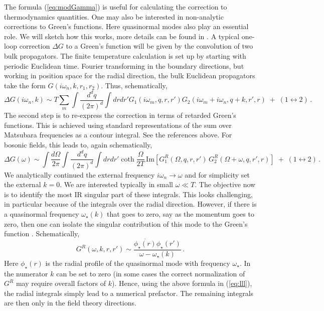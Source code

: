 \documentclass[10pt, oneside]{book}
\def\be{\begin{equation}}
\def\ee{\end{equation}}
\begin{document}
\begin{doublespace}
The formula (\ref{eq:modGamma}) is useful for calculating the correction to thermodynamics quantities. One may also be interested in non-analytic corrections to Green's functions. Here quasinormal modes also play an essential role. We will sketch how this works, more details can be found in \cite{caronhuot, Hartman:2010fk, Anninos:2010sq, Faulkner:2013bna}. A typical one-loop correction $\Delta G$ to a Green's function will be given by the convolution of two bulk propagators. The finite temperature calculation is set up by starting with periodic Euclidean time. Fourier transforming in the boundary directions, but working in position space for the radial direction, the bulk Euclidean propagators take the form $G(i\omega_n, k, r_1,r_2)$. Thus, schematically, 
\be
\Delta G(i\omega_n,k) \sim T \sum_m \int \frac{d^dq}{(2\pi)^d} \int dr dr'  G_1(i \omega_m,q,r,r') G_2(i \omega_m + i \omega_n,q+k,r',r) \; + \; (1 \leftrightarrow 2)  \,.
\ee
The second step is to re-express the correction in terms of retarded Green's functions. This is achieved using standard representations of the sum over Matsubara frequencies as a contour integral. See the references above. For bosonic fields, this leads to, again schematically,
\be\label{eq:lll}
\Delta G(\omega) \sim \int \frac{d\Omega}{2 \pi} \int \frac{d^dq}{(2\pi)^d} \int dr dr' \coth \frac{\Omega}{2T} \, \text{Im}\left[ G_1^R(\Omega,q,r,r') \, G_2^R(\Omega + \omega,q,r',r) 
 \right]  \; + \; (1 \leftrightarrow 2) \,.
\ee
We analytically continued the external frequency $i \omega_n \to \omega$ and for simplicity set the external $k=0$. We are interested typically in small $\omega \ll T$. The objective now is to identify the most IR singular part of these integrals. This looks challenging, in particular because of the integrals over the radial direction. However, if there is a quasinormal frequency $\omega_\star(k)$ that goes to zero, say as the momentum goes to zero, then one can isolate the singular contribution of this mode to the Green's function \cite{Anninos:2010sq}. Schematically,
\be\label{eq:zoomin}
G^R(\omega,k,r,r') \sim \frac{\overline{\phi_\star(r)} \phi_\star(r')}{\omega - \omega_\star(k)} \,.
\ee
Here $\phi_\star(r)$ is the radial profile of the quasinormal mode with frequency $\omega_\star$. In the numerator $k$ can be set to zero (in some cases the correct normalization of $G^R$ may require overall factors of $k$). Hence, using the above formula in (\ref{eq:lll}), the radial integrals simply lead to a numerical prefactor. The remaining integrals are then only in the field theory directions.


\end{doublespace}
\end{document}

